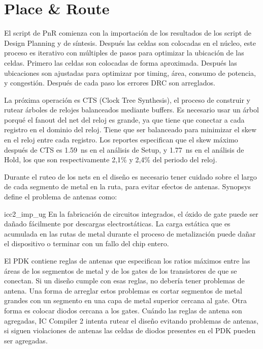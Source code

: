 \documentclass[a4paper, twoside, 11pt]{report}
\begin{document}
\FloatBarrier
\section{Place \& Route}

El script de PnR comienza con la importación de los resultados de los script de Design Planning y de síntesis. Después las celdas son colocadas en el núcleo, este proceso es iterativo con múltiples de pasos para optimizar la ubicación de las celdas. Primero las celdas son colocadas de forma aproximada. Después las ubicaciones son ajustadas para optimizar por timing, área, consumo de potencia, y congestión. Después de cada paso los errores DRC son arreglados.

La próxima operación es CTS (Clock Tree Synthesis), el proceso de construir y rutear árboles de relojes balanceados mediante buffers. Es necesario usar un árbol porqué el fanout del net del reloj es grande, ya que tiene que conectar a cada registro en el dominio del reloj. Tiene que ser balanceado para minimizar el skew en el reloj entre cada registro. Los reportes especifican que el skew máximo después de CTS es \SI{1.59}{\nano\second} en el análisis de Setup, y \SI{1.77}{\nano\second} en el análisis de Hold, los que son respectivamente 2,1\% y 2,4\% del periodo del reloj.

Durante el ruteo de los nets en el diseño es necesario tener cuidado sobre el largo de cada segmento de metal en la ruta, para evitar efectos de antenas. Synopsys define el problema de antenas como:

\begin{displaycquote}{icc2_imp_ug}
  En la fabricación de circuitos integrados, el óxido de gate puede ser dañado fácilmente por descargas electrostáticas. La carga estática que es acumulada en las rutas de metal durante el proceso de metalización puede dañar el dispositivo o terminar con un fallo del chip entero.
\end{displaycquote}

El PDK contiene reglas de antenas que especifican los ratios máximos entre las áreas de los segmentos de metal y de los gates de los transistores de que se conectan. Si un diseño cumple con esas reglas, no debería tener problemas de antena. Una forma de arreglar estos problemas es cortar segmentos de metal grandes con un segmento en una capa de metal superior cercana al gate. Otra forma es colocar diodos cercana a los gates. Cuándo las reglas de antena son agregadas, IC Compiler 2 intenta rutear el diseño evitando problemas de antenas, si siguen violaciones de antenas las celdas de diodos presentes en el PDK pueden ser agregadas.
\end{document}
